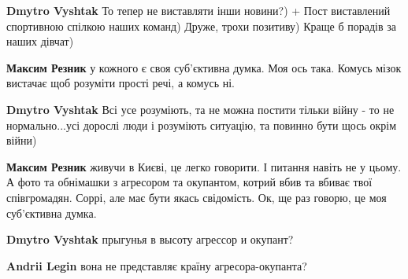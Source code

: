 \begin{itemize}
\begin{itemize}
\textbf{Dmytro Vyshtak} То тепер не виставляти інши новини?) + Пост виставлений спортивною спілкою наших команд)
Друже, трохи позитиву) Краще б порадів за наших дівчат)

\begin{itemize}
 
\textbf{Максим Резник} у кожного є своя суб’єктивна думка. Моя ось така. Комусь мізок вистачає щоб розуміти прості речі, а комусь ні.

 
\textbf{Dmytro Vyshtak} Всі усе розуміють, та не можна постити тільки війну - то не нормально...усі дорослі люди і розуміють ситуацію, та повинно бути щось окрім війни)

 
\textbf{Максим Резник} живучи в Києві, це легко говорити. І питання навіть не у цьому. А фото та обнімашки з агресором та окупантом, котрий вбив та вбиває твої співгромадян. Соррі, але має бути якась свідомість. Ок, ще раз говорю, це моя суб’єктивна думка.

 
\textbf{Dmytro Vyshtak} прыгунья в высоту агрессор и окупант?

 
\textbf{Andrii Legin} вона не представляє країну агресора-окупанта?


\end{itemize}
\end{itemize}
\end{itemize}
